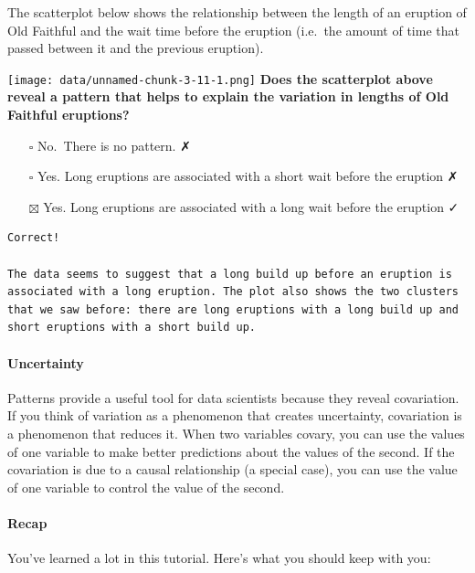 \documentclass[
]{article}
\providecommand{\tightlist}{%
  \setlength{\itemsep}{0pt}\setlength{\parskip}{0pt}}
\begin{document}
The scatterplot below shows the relationship between the length of an
eruption of Old Faithful and the wait time before the eruption (i.e.~the
amount of time that passed between it and the previous eruption).

\texttt{[image: data/unnamed-chunk-3-11-1.png]} \textbf{Does the
scatterplot above reveal a pattern that helps to explain the variation
in lengths of Old Faithful eruptions?}

\begin{itemize}
\tightlist
\item[$\square$]
  No.~There is no pattern. ✗
\item[$\square$]
  Yes. Long eruptions are associated with a short wait before the
  eruption ✗
\item[$\boxtimes$]
  Yes. Long eruptions are associated with a long wait before the
  eruption ✓
\end{itemize}

\begin{verbatim}
Correct!

The data seems to suggest that a long build up before an eruption is associated with a long eruption. The plot also shows the two clusters that we saw before: there are long eruptions with a long build up and short eruptions with a short build up.
\end{verbatim}

\hypertarget{uncertainty}{%
\paragraph{Uncertainty}\label{uncertainty}}

Patterns provide a useful tool for data scientists because they reveal
covariation. If you think of variation as a phenomenon that creates
uncertainty, covariation is a phenomenon that reduces it. When two
variables covary, you can use the values of one variable to make better
predictions about the values of the second. If the covariation is due to
a causal relationship (a special case), you can use the value of one
variable to control the value of the second.

\hypertarget{recap-3}{%
\paragraph{Recap}\label{recap-3}}

You've learned a lot in this tutorial. Here's what you should keep with
you:
\end{document}
